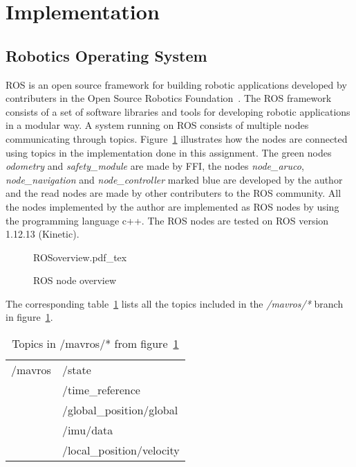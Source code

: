 \section{Implementation} %
\label{sec:implementation}

\subsection{Robotics Operating System} %
\label{sub:robotics_operating_system}
\gls{ROS} is an open source framework for building robotic applications developed by contributers in the Open Source Robotics Foundation~\citep{AboutROS}. The \gls{ROS} framework consists of a set of software libraries and tools for developing robotic applications in a modular way. A system running on \gls{ROS} consists of multiple nodes communicating through topics. Figure~\ref{fig:nodeOverview} illustrates how the nodes are connected using topics in the implementation done in this assignment. The green nodes \textit{odometry} and \textit{safety\_module} are made by \gls{FFI}, the nodes \textit{node\_aruco}, \textit{node\_navigation} and \textit{node\_controller} marked blue are developed by the author and the read nodes are made by other contributers to the \gls{ROS} community. All the nodes implemented by the author are implemented as \gls{ROS} nodes by using the programming language c++. The \gls{ROS} nodes are tested on \gls{ROS} version 1.12.13 (Kinetic).
\begin{figure}[ht]
    \centering
    {ROSoverview.pdf_tex}
    \caption{ROS node overview}
    \label{fig:nodeOverview}
\end{figure}
The corresponding table~\ref{tab:mavrosTopics} lists all the topics included in the \textit{/mavros/*} branch in figure~\ref{fig:nodeOverview}.
\begin{table}[!htb]
  \centering
  \renewcommand{\tabcolsep}{.1mm}
  \begin{tabular}{l l}
    \toprule
    /mavros&/state\\
    &/time\_reference\\
    &/global\_position/global\\
    &/imu/data\\
    &/local\_position/velocity\\
    \bottomrule
  \end{tabular}
  \caption{Topics in /mavros/* from figure~\ref{fig:nodeOverview}}
  \label{tab:mavrosTopics}
\end{table}
